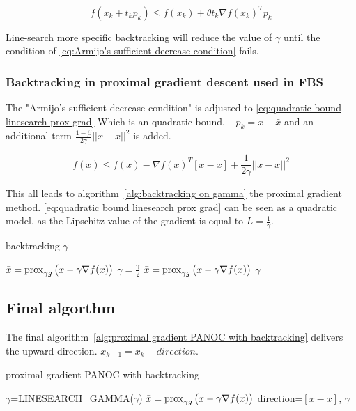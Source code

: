 			\begin{equation}
			f(x_k + t_kp_k) \leq f(x_k) + \theta t_k \nabla f(x_k)^Tp_k
			\label{eq:Armijo's sufficient decrease condition}
			\end{equation}
			
			Line-search more specific backtracking will reduce the value of $\gamma$ until the condition of \eqref{eq:Armijo's sufficient decrease condition} fails.
			
		\subsubsection{Backtracking in proximal gradient descent used in FBS}
			The  "Armijo's sufficient decrease condition" is adjusted to \eqref{eq:quadratic bound linesearch prox grad} Which is an quadratic bound, $-p_k=x-\bar{x}$ and an additional term $\frac{1-\beta}{2 \gamma}||x-\bar{x}||^2$ is added.
			
			\begin{equation}
			f({\bar{x}}) \leq f(x) - \nabla f(x)^T[x-\bar{x}] + \frac{1}{2 \gamma}||x-\bar{x}||^2
			\label{eq:quadratic bound linesearch prox grad}
			\end{equation}
			
			This all leads to algorithm~\ref{alg:backtracking on gamma} the proximal gradient method. \eqref{eq:quadratic bound linesearch prox grad} can be seen as a quadratic model, as the Lipschitz value of the gradient is equal to $L=\frac{1}{\gamma}$.
			
			\begin{algorithm}
				\caption{backtracking $\gamma$}
				\label{alg:backtracking on gamma}
				\begin{algorithmic}[1]
					\State $\bar{x} = \operatorname{prox}_{\gamma g}\big( x- \gamma \nabla f(x)\big)$
					\State $\gamma = \frac{\gamma}{2}$
					\State $\bar{x} = \operatorname{prox}_{\gamma g}\big( x- \gamma \nabla f(x)\big)$
					\EndWhile
					\State \Return $\gamma$
					\EndProcedure
				\end{algorithmic}
			\end{algorithm}
	\subsection{Final algorthm}
		The final algorithm~\ref{alg:proximal gradient PANOC with backtracking} delivers the upward direction. $x_{k+1}=x_k - direction$.
		\begin{algorithm}
			\caption{proximal gradient PANOC with backtracking}
			\label{alg:proximal gradient PANOC with backtracking}
			\begin{algorithmic}[1]
				\Procedure{get\_proximal\_gradient\_step}{x,$\gamma$}
				\State $\gamma$=LINESEARCH\_GAMMA($\gamma$)
				\State $\bar{x} = \operatorname{prox}_{\gamma g}\big( x- \gamma \nabla f(x)\big)$
				\State \Return direction=$[x-\bar{x}]$, $\gamma$
				\EndProcedure
			\end{algorithmic}
		\end{algorithm}